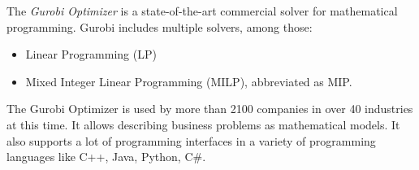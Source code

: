 \documentclass[../../thesis.tex]{subfiles}
\begin{document}
The \emph{Gurobi Optimizer} \cite{gurobi} is a state-of-the-art commercial solver for mathematical programming. 
Gurobi includes multiple solvers, among those:

\begin{itemize}
  \item Linear Programming (LP)
  \item Mixed Integer Linear Programming (MILP), abbreviated as MIP.
\end{itemize}

The Gurobi Optimizer is used by more than 2100 companies in over 40 industries at this time. It allows 
describing business problems as mathematical models. It also supports a lot of programming interfaces
in a variety of programming languages like C++, Java, Python, C\#.
\end{document}
